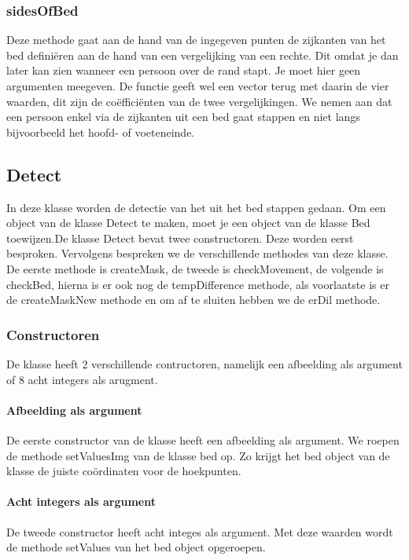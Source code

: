 \subsubsection{sidesOfBed}
Deze methode gaat aan de hand van de ingegeven punten de zijkanten van het bed defini\"eren aan de hand van een vergelijking van een rechte. Dit omdat je dan later kan zien wanneer een persoon over de rand stapt. Je moet hier geen argumenten meegeven. De functie geeft wel een vector terug met daarin de vier waarden, dit zijn de co\"effici\"enten van de twee vergelijkingen. We nemen aan dat een persoon enkel via de zijkanten uit een bed gaat stappen en niet langs bijvoorbeeld het hoofd- of voeteneinde.

\subsection{Detect}
\label{mRefDet}
In deze klasse worden de detectie van het uit het bed stappen gedaan. Om een object van de klasse Detect te maken, moet je een object van de klasse Bed toewijzen.De klasse Detect bevat twee constructoren. Deze worden eerst besproken. Vervolgens bespreken we de verschillende methodes van deze klasse. De eerste methode is createMask, de tweede is checkMovement, de volgende is checkBed, hierna is er ook nog de tempDifference methode, als voorlaatste is er de createMaskNew methode en om af te sluiten hebben we de erDil methode. 

\subsubsection{Constructoren}
De klasse heeft 2 verschillende contructoren, namelijk een afbeelding als argument of 8 acht integers als arugment.

\paragraph{Afbeelding als argument}
De eerste constructor van de klasse heeft een afbeelding als argument. We  roepen de methode setValuesImg van de klasse bed op. Zo krijgt het bed object van de klasse de juiste co\"ordinaten voor de hoekpunten. 

\paragraph{Acht integers als argument}
De tweede constructor heeft acht integes als argument. Met deze waarden wordt de methode setValues van het bed object opgeroepen.

